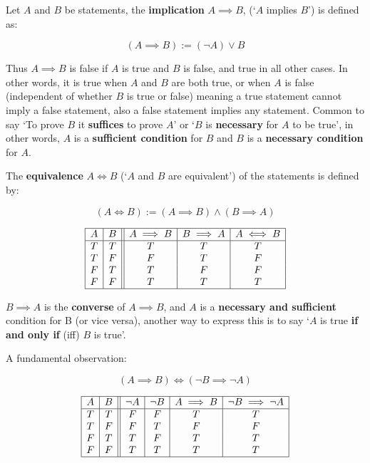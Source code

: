 Let $A$ and $B$ be statements, the \textbf{implication} $A \implies B$, (`$A$ implies $B$') is defined as:

\begin{equation}\label{eqn:implies definition}
    (A \implies B) := (\neg A) \lor B
\end{equation}

Thus $A \implies B$ is false if $A$ is true and $B$ is false, and true in all other cases. In other words, it is true when $A$ and $B$ are both true, or when $A$ is false (independent of whether $B$ is true or false) meaning a true statement cannot imply a false statement, also a false statement implies any statement. Common to say `To prove $B$ it \textbf{suffices} to prove $A$' or `$B$ is \textbf{necessary} for $A$ to be true', in other words, $A$ is a \textbf{sufficient condition} for $B$ and $B$ is a \textbf{necessary condition} for $A$.

The \textbf{equivalence} $A \iff B$ (`$A$ and $B$ are equivalent') of the statements is defined by:

$$
(A \iff B) := (A \implies B) \land (B \implies A)
$$

$$
\begin{array}{|c|c||c|c|c|}
    \hline
    A & B & A \implies B & B \implies A & A \iff B \\
    \hline
    T & T & T & T & T \\
    T & F & F & T & F \\
    F & T & T & F & F \\
    F & F & T & T & T \\
    \hline
\end{array}
$$

\noindent $B \implies A$ is the \textbf{converse} of $A \implies B$, and $A$ is a \textbf{necessary and sufficient} condition for B (or vice versa), another way to express this is to say `$A$ is true \textbf{if and only if} (iff) $B$ is true'.

A fundamental observation:

\begin{equation}
    (A \implies B) \iff (\neg B \implies \neg A)
\end{equation}

$$
\begin{array}{|c|c||c|c|c|c|}
    \hline
    A & B & \neg A & \neg B & A \implies B & \neg B \implies \neg A \\
    \hline
    T & T & F & F & T & T \\
    T & F & F & T & F & F \\
    F & T & T & F & T & T \\
    F & F & T & T & T & T \\
    \hline
\end{array}
$$

